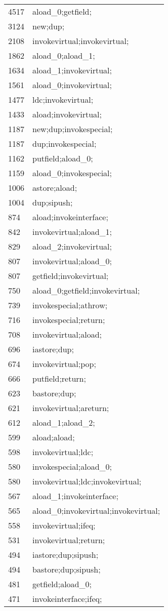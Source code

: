   \begin{tabular}{l l}
	4517	&	aload\_0;getfield;	\\
	3124	&	new;dup;	\\
	2108	&	invokevirtual;invokevirtual;	\\
	1862	&	aload\_0;aload\_1;	\\
	1634	&	aload\_1;invokevirtual;	\\
	1561	&	aload\_0;invokevirtual;	\\
	1477	&	ldc;invokevirtual;	\\
	1433	&	aload;invokevirtual;	\\
	1187	&	new;dup;invokespecial;	\\
	1187	&	dup;invokespecial;	\\
	1162	&	putfield;aload\_0;	\\
	1159	&	aload\_0;invokespecial;	\\
	1006	&	astore;aload;	\\
	1004	&	dup;sipush;	\\
	874	&	aload;invokeinterface;	\\
	842	&	invokevirtual;aload\_1;	\\
	829	&	aload\_2;invokevirtual;	\\
	807	&	invokevirtual;aload\_0;	\\
	807	&	getfield;invokevirtual;	\\
	750	&	aload\_0;getfield;invokevirtual;	\\
	739	&	invokespecial;athrow;	\\
	716	&	invokespecial;return;	\\
	708	&	invokevirtual;aload;	\\
	696	&	iastore;dup;	\\
	674	&	invokevirtual;pop;	\\
	666	&	putfield;return;	\\
	623	&	bastore;dup;	\\
	621	&	invokevirtual;areturn;	\\
	612	&	aload\_1;aload\_2;	\\
	599	&	aload;aload;	\\
	598	&	invokevirtual;ldc;	\\
	580	&	invokespecial;aload\_0;	\\
	580	&	invokevirtual;ldc;invokevirtual;	\\
	567	&	aload\_1;invokeinterface;	\\
	565	&	aload\_0;invokevirtual;invokevirtual;	\\
	558	&	invokevirtual;ifeq;	\\
	531	&	invokevirtual;return;	\\
	494	&	iastore;dup;sipush;	\\
	494	&	bastore;dup;sipush;	\\
	481	&	getfield;aload\_0;	\\
	471	&	invokeinterface;ifeq;

  \end{tabular}
